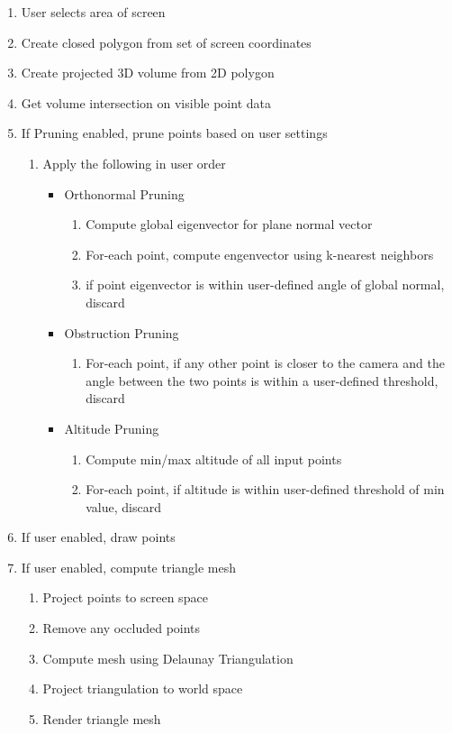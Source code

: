 \begin{enumerate}
  \item User selects area of screen
  \item Create closed polygon from set of screen coordinates
  \item Create projected 3D volume from 2D polygon
  \item Get volume intersection on visible point data
  \item If Pruning enabled, prune points based on user settings
  \begin{enumerate}
    \item Apply the following in user order
    \begin{itemize}
      \item Orthonormal Pruning
      \begin{enumerate}
        \item Compute global eigenvector for plane normal vector
        \item For-each point, compute engenvector using k-nearest neighbors
        \item if point eigenvector is within user-defined angle of global normal, discard
      \end{enumerate}
      \item Obstruction Pruning
      \begin{enumerate}
        \item For-each point, if any other point is closer to the camera and the angle between the two points is within a user-defined threshold, discard
      \end{enumerate}
      \item Altitude Pruning
      \begin{enumerate}
        \item Compute min/max altitude of all input points
        \item For-each point, if altitude is within user-defined threshold of min value, discard
      \end{enumerate}
    \end{itemize}
  \end{enumerate}
  \item If user enabled, draw points
  \item If user enabled, compute triangle mesh
    \begin{enumerate}
      \item Project points to screen space
      \item Remove any occluded points
      \item Compute mesh using Delaunay Triangulation
      \item Project triangulation to world space
      \item Render triangle mesh
    \end{enumerate}
\end{enumerate}

